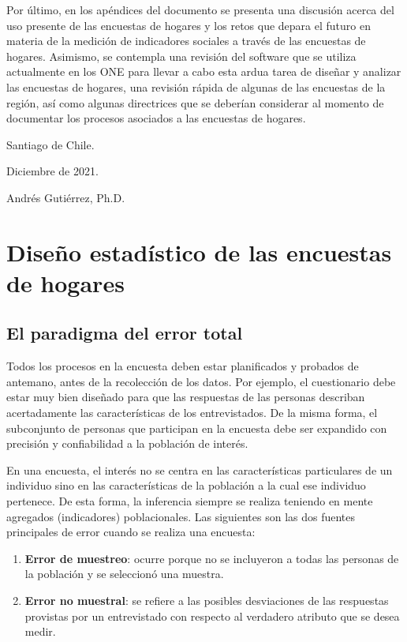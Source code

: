 \documentclass[
  12pt,
  spanish,
]{book}
\providecommand{\tightlist}{%
  \setlength{\itemsep}{0pt}\setlength{\parskip}{0pt}}
\begin{document}
Por último, en los apéndices del documento se presenta una discusión acerca del uso presente de las encuestas de hogares y los retos que depara el futuro en materia de la medición de indicadores sociales a través de las encuestas de hogares. Asimismo, se contempla una revisión del software que se utiliza actualmente en los ONE para llevar a cabo esta ardua tarea de diseñar y analizar las encuestas de hogares, una revisión rápida de algunas de las encuestas de la región, así como algunas directrices que se deberían considerar al momento de documentar los procesos asociados a las encuestas de hogares.

Santiago de Chile.

Diciembre de 2021.

Andrés Gutiérrez, Ph.D.~

\hypertarget{part-diseuxf1o-estaduxedstico-de-las-encuestas-de-hogares}{%
\part{Diseño estadístico de las encuestas de hogares}\label{part-diseuxf1o-estaduxedstico-de-las-encuestas-de-hogares}}

\hypertarget{el-paradigma-del-error-total}{%
\chapter{El paradigma del error total}\label{el-paradigma-del-error-total}}

Todos los procesos en la encuesta deben estar planificados y probados de antemano, antes de la recolección de los datos. Por ejemplo, el cuestionario debe estar muy bien diseñado para que las respuestas de las personas describan acertadamente las características de los entrevistados. De la misma forma, el subconjunto de personas que participan en la encuesta debe ser expandido con precisión y confiabilidad a la población de interés.

En una encuesta, el interés no se centra en las características particulares de un individuo sino en las características de la población a la cual ese individuo pertenece. De esta forma, la inferencia siempre se realiza teniendo en mente agregados (indicadores) poblacionales. Las siguientes son las dos fuentes principales de error cuando se realiza una encuesta:

\begin{enumerate}
\def\labelenumi{\arabic{enumi}.}
\tightlist
\item
  \textbf{Error de muestreo}: ocurre porque no se incluyeron a todas las personas de la población y se seleccionó una muestra.
\item
  \textbf{Error no muestral}: se refiere a las posibles desviaciones de las respuestas provistas por un entrevistado con respecto al verdadero atributo que se desea medir.
\end{enumerate}
\end{document}
